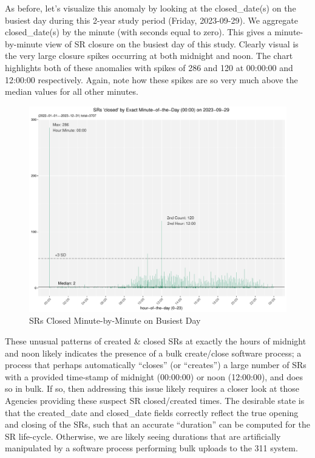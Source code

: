 \documentclass[12pt, titlepage]{article}
\begin{document}
	As before, let's visualize this anomaly by looking at the closed\_date(s) 
	on the busiest day during this 2-year study period (Friday, 2023-09-29). 
	We aggregate closed\_date(s) by the minute (with seconds equal to zero). 
	This gives a minute-by-minute view of SR closure on the busiest day 
	of this study. Clearly visual is the very large closure spikes occurring at 
	both midnight and noon. The chart highlights both of these anomalies 
	with spikes of 286 and 120 at 00:00:00 and 12:00:00 respectively. 
	Again, note how these spikes are so very much above the median 
	values for all other minutes.

 	\begin{figure}[tbp]
		\centering
		\includegraphics[width=\textwidth]
		{2-year-trend-SR_closed_by_minute_of_busiest_day.pdf}
		\caption{SRs Closed Minute-by-Minute on Busiest Day}
		\label{fig:busiestclosed}
	\end{figure}	

	These unusual patterns of created \& closed SRs at exactly the hours 
	of midnight and noon likely indicates the presence of a bulk create/close 
	software process; a process that perhaps automatically ``closes'' 
	(or ``creates'') a large number of SRs with a provided time-stamp of 
	midnight (00:00:00) or noon (12:00:00), and does so in bulk. 
	If so, then addressing this issue likely requires a closer look at those 
	Agencies providing these suspect SR closed/created times. The desirable 
	state is that the created\_date and closed\_date fields correctly 
	reflect the true opening and closing of the SRs, such that an 
	accurate ``duration'' can be computed for the SR life-cycle. 
	Otherwise, we are likely seeing durations that are artificially 
	manipulated by a software process performing bulk uploads 
	to the 311 system.
\end{document}
